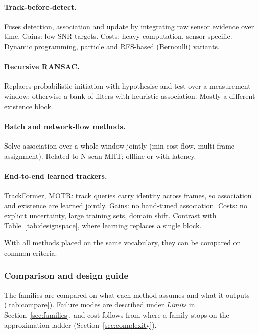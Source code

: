 \paragraph{\textcolor{famOUT}{Track-before-detect.}}
Fuses detection, association and update by integrating raw sensor evidence over time. Gains: low-SNR targets. Costs: heavy computation, sensor-specific. Dynamic programming, particle and RFS-based (Bernoulli) variants.
\paragraph{\textcolor{famOUT}{Recursive RANSAC.}}
Replaces probabilistic initiation with hypothesise-and-test over a measurement window; otherwise a bank of filters with heuristic association. Mostly a different existence block.
\paragraph{\textcolor{famOUT}{Batch and network-flow methods.}}
Solve association over a whole window jointly (min-cost flow, multi-frame assignment). Related to N-scan MHT; offline or with latency.
\paragraph{\textcolor{famOUT}{End-to-end learned trackers.}}
TrackFormer, MOTR: track queries carry identity across frames, so association and existence are learned jointly. Gains: no hand-tuned association. Costs: no explicit uncertainty, large training sets, domain shift. Contrast with Table~\ref{tab:designspace}, where learning replaces a single block.

With all methods placed on the same vocabulary, they can be compared on common criteria.

\subsubsection{Comparison and design guide}
\label{sec:selection}

The families are compared on what each method assumes and what it outputs (\autoref{tab:compare}). Failure modes are described under \emph{Limits} in Section~\ref{sec:families}, and cost follows from where a family stops on the approximation ladder (Section~\ref{sec:complexity}).

